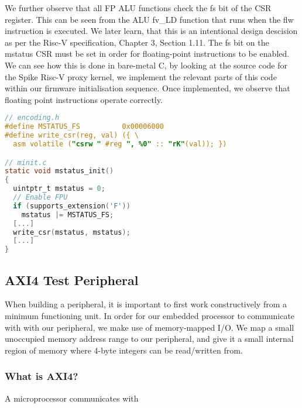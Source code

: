 \documentclass[a4paper,8pt]{report}
\begin{document}
We further observe that all FP ALU functions check the fs bit of the CSR register.
This can be seen from the ALU fv\_LD function that runs when the flw instruction
is executed. We later learn, that this is an intentional design descision as per
the Risc-V specification, Chapter 3, Section 1.11. The fs bit on the mstatus CSR must be
set in order for floating-point instructions to be enabled. We can see how this
is done in bare-metal C, by looking at the source code for the Spike Risc-V
proxy kernel, we implement the relevant parts of this code within our firmware
initialisation sequence. Once implemented, we observe that floating point
instructions operate correctly.
\begin{lstlisting}[language=C,style=customc]
// encoding.h
#define MSTATUS_FS          0x00006000
#define write_csr(reg, val) ({ \
  asm volatile ("csrw " #reg ", %0" :: "rK"(val)); })

// minit.c
static void mstatus_init()
{
  uintptr_t mstatus = 0;
  // Enable FPU
  if (supports_extension('F'))
    mstatus |= MSTATUS_FS;
  [...]
  write_csr(mstatus, mstatus);
  [...]
}
\end{lstlisting}


\subsection{AXI4 Test Peripheral}
When building a peripheral, it is important to first work constructively from a
minimum functioning unit. In order for our embedded processor to communicate
with with our peripheral, we make use of memory-mapped I/O. We map a small
unoccupied memory address range to our peripheral, and give it a small internal
region of memory where 4-byte integers can be read/written from.

\subsubsection{What is AXI4?}
A microprocessor communicates with 
\end{document}
